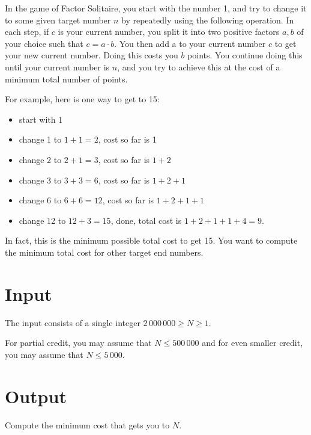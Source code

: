 In the game of Factor Solitaire, you start with the number 1, and try to change it to some given
target number $n$ by repeatedly using the following operation. In each step, if $c$ is your current
number, you split it into two positive factors $a, b$ of your choice such that $c = a \cdot b$. You
then add a to your current number $c$ to get your new current number. Doing this costs you $b$ points.
You continue doing this until your current number is $n$, and you try to achieve this at the cost of
a minimum total number of points.

For example, here is one way to get to 15:
\begin{itemize}
\item start with 1
\item change 1 to $1+1 = 2$, cost so far is 1
\item change 2 to $2+1 = 3$, cost so far is $1+2$
\item change 3 to $3+3 = 6$, cost so far is $1+2+1$
\item change 6 to $6+6 = 12$, cost so far is $1+2+1+1$
\item change 12 to $12+3 = 15$, done, total cost is $1+2+1+1+4=9$.
\end{itemize}

In fact, this is the minimum possible total cost to get 15. You want to compute the minimum total
cost for other target end numbers.

\section*{Input}
The input consists of a single integer $2\,000\,000 \ge N \ge 1$.

For partial credit, you may assume that $N \le 500\,000$ and for even smaller credit, you may
assume that $N \le 5\,000$.


\section*{Output}
Compute the minimum cost that gets you to $N$.
